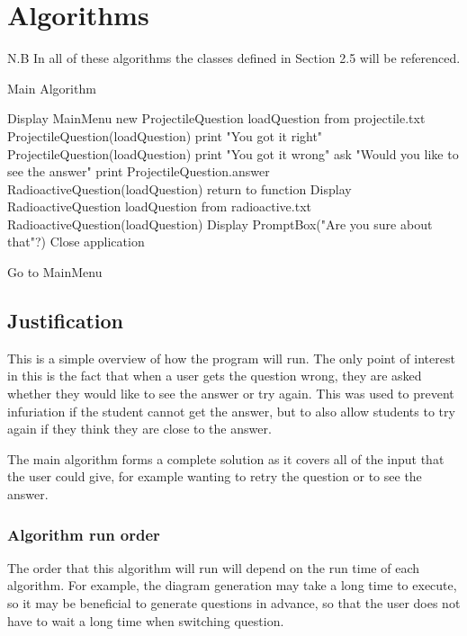 \section{Algorithms}
N.B In all of these algorithms the classes defined in Section 2.5 will be referenced.
\begin{algorithm}
	\label{mainps}
	\caption{Main Algorithm}
	\begin{algorithmic}[1]
		\State Display MainMenu
			\State new ProjectileQuestion
			\State loadQuestion from projectile.txt
			\State ProjectileQuestion(loadQuestion)
			\State print "You got it right"
			\State ProjectileQuestion(loadQuestion)
			\Else
			\State print "You got it wrong"
			\State ask "Would you like to see the answer"
			\State print ProjectileQuestion.answer
			\State RadioactiveQuestion(loadQuestion)
			\Else
			\State return to function
			\EndIf
			\EndIf
		\EndIf
			\State Display RadioactiveQuestion
			\State loadQuestion from radioactive.txt
			\State RadioactiveQuestion(loadQuestion)
		\EndIf
			\State Display PromptBox("Are you sure about that"?)
				\State Close application
			
			\Else
				\State Go to MainMenu
			\EndIf
		\EndIf
	\end{algorithmic}
\end{algorithm}
\subsection{Justification}
This is a simple overview of how the program will run. The only point of interest in this is the fact that when a user gets the question wrong, they are asked whether they would like to see the answer or try again. This was used to prevent infuriation if the student cannot get the answer, but to also allow students to try again if they think they are close to the answer. 

The main algorithm forms a complete solution as it covers all of the input that the user could give, for example wanting to retry the question or to see the answer.
\subsubsection{Algorithm run order}
The order that this algorithm will run will depend on the run time of each algorithm. For example, the diagram generation may take a long time to execute, so it may be beneficial to generate questions in advance, so that the user does not have to wait a long time when switching question. 

